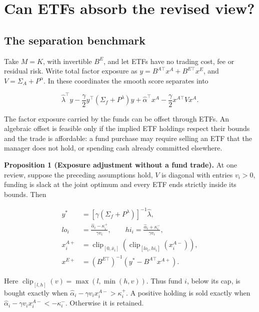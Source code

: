 \documentclass[11pt]{article}
\begin{document}
\section{Can ETFs absorb the revised view?}\label{sec:3}

\subsection{The separation benchmark}\label{sec:3.1}

Take \(M=K\), with invertible \(B^E\), and let ETFs have no trading cost, fee or residual risk. Write total factor exposure as \(y=B^{A\top}x^A+B^{E\top}x^E\), and \(V=\Sigma_A+P^\alpha\). In these coordinates the smooth score separates into

\begin{equation*}
\hat\lambda^\top y-\frac\gamma2 y^\top(\Sigma_f+P^\lambda)y
+\hat\alpha^\top x^A-\frac\gamma2 x^{A\top}Vx^A.
\tag{9}\label{eq:9}
\end{equation*}

The factor exposure carried by the funds can be offset through ETFs. An algebraic offset is feasible only if the implied ETF holdings respect their bounds and the trade is affordable: a fund purchase may require selling an ETF that the manager does not hold, or spending cash already committed elsewhere.

\label{res:Proposition-1}
\textbf{Proposition 1 (Exposure adjustment without a fund trade).} At one review, suppose the preceding assumptions hold, \(V\) is diagonal with entries \(v_i>0\), funding is slack at the joint optimum and every ETF ends strictly inside its bounds. Then

\begin{equation*}
\begin{aligned}
y^*&=[\gamma(\Sigma_f+P^\lambda)]^{-1}\hat\lambda,\\
lo_i&=\frac{\hat\alpha_i-\kappa_i^+}{\gamma v_i},\qquad
hi_i=\frac{\hat\alpha_i+\kappa_i^-}{\gamma v_i},\\
x_i^{A+}&=\operatorname{clip}_{[0,\bar x_i]}\!\left(\operatorname{clip}_{[lo_i,hi_i]}(x_i^{A-})\right),\\
x^{E+}&=(B^{E\top})^{-1}(y^*-B^{A\top}x^{A+}).
\end{aligned}
\tag{10}\label{eq:10}
\end{equation*}

Here \(\operatorname{clip}_{[l,h]}(v)=\max(l,\min(h,v))\). Thus fund \(i\), below its cap, is bought exactly when \(\hat\alpha_i-\gamma v_i x_i^{A-}>\kappa_i^+\). A positive holding is sold exactly when \(\hat\alpha_i-\gamma v_i x_i^{A-}<-\kappa_i^-\). Otherwise it is retained.
\end{document}
